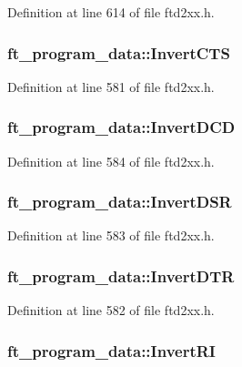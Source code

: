 Definition at line 614 of file ftd2xx.h.\hypertarget{structft__program__data_a734bfebe12af33d52e2afe07750be245}{
\subsubsection[{InvertCTS}]{ {\bf ft\_\-program\_\-data::InvertCTS}}}
\label{structft__program__data_a734bfebe12af33d52e2afe07750be245}


Definition at line 581 of file ftd2xx.h.\hypertarget{structft__program__data_a0c0b909429d5c1d25bbe1acfcda19500}{
\subsubsection[{InvertDCD}]{ {\bf ft\_\-program\_\-data::InvertDCD}}}
\label{structft__program__data_a0c0b909429d5c1d25bbe1acfcda19500}


Definition at line 584 of file ftd2xx.h.\hypertarget{structft__program__data_ad7ab73b7989cb83dc2bf31d09d8a7ffa}{
\subsubsection[{InvertDSR}]{ {\bf ft\_\-program\_\-data::InvertDSR}}}
\label{structft__program__data_ad7ab73b7989cb83dc2bf31d09d8a7ffa}


Definition at line 583 of file ftd2xx.h.\hypertarget{structft__program__data_af1ad28c6b71e397b08a3bda07a2f0329}{
\subsubsection[{InvertDTR}]{ {\bf ft\_\-program\_\-data::InvertDTR}}}
\label{structft__program__data_af1ad28c6b71e397b08a3bda07a2f0329}


Definition at line 582 of file ftd2xx.h.\hypertarget{structft__program__data_a488afb1f4d72b128ea44a1e4d5131172}{
\subsubsection[{InvertRI}]{ {\bf ft\_\-program\_\-data::InvertRI}}}
\label{structft__program__data_a488afb1f4d72b128ea44a1e4d5131172}


